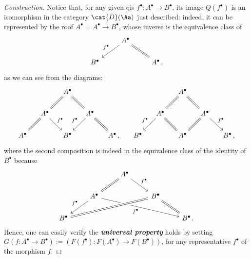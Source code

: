 \begin{thmdef}
\begin{proof}[Construction]
        Notice that, for any given qis
        $f^{\bullet}:A^{\bullet} \to B^{\bullet}$,
        its image $Q(f^{\bullet})$ is an isomorphism
        in the category $\cat{D}(\Aa)$ just described:
        indeed, it can be represented by the roof
        $A^{\bullet} = A^{\bullet} \to B^{\bullet}$,
        whose inverse is the equivalence class of
        \begin{equation*}
            \begin{tikzcd}
                & A^{\bullet} \ar[dr, equals] \ar[dl, "f^{\bullet}"'] & \\
                B^{\bullet} & & A^{\bullet}\,,
            \end{tikzcd}
        \end{equation*}
        as we can see from the diagrams:
        \begin{equation*}
            \begin{tikzcd}[column sep=small]
                && A^{\bullet} \ar[dl, equals] \ar[dr, equals] && &
                && A^{\bullet} \ar[dl, equals] \ar[dr, equals] && \\
                & A^{\bullet} \ar[dl, equals] \ar[dr, "f^{\bullet}"]
                && A^{\bullet} \ar[dr, equals] \ar[dl, "f^{\bullet}"'] & &
                & A^{\bullet} \ar[dr, equals] \ar[dl, "f^{\bullet}"']
                && A^{\bullet} \ar[dl, equals] \ar[dr, "f^{\bullet}"] &\\
                A^{\bullet} & & B^{\bullet} & & A^{\bullet} \,, &
                B^{\bullet} & & A^{\bullet} & & B^{\bullet}\,,
            \end{tikzcd}
        \end{equation*}
        where the second composition is indeed in the equivalence class of the
        identity of $B^{\bullet}$ because
        \begin{equation*}
            \begin{tikzcd}
                & & A^{\bullet} \arrow[ld, equals] \arrow[rd, "f^{\bullet}"]  
                & & \\
                & A^{\bullet} \arrow[ld, "f^{\bullet}"'] \arrow[rrrd, "f^{\bullet}"'] 
                & & B^{\bullet} \arrow[llld, equals, crossing over] \arrow[rd, equals] 
                & \\
                B^{\bullet} 
                &  &  &  & B^{\bullet}\,.
            \end{tikzcd}
        \end{equation*}
        Hence, one can easily verify the \emph{\textbf{universal property}}
        holds by setting $G(f:A^{\bullet} \to B^{\bullet}) 
        := \left(F(f^{\bullet}):F(A^{\bullet}) \to F(B^{\bullet}) \right)$,
        for any representative $f^{\bullet}$ of the morphism $f$.
    \end{proof}
\end{thmdef}

